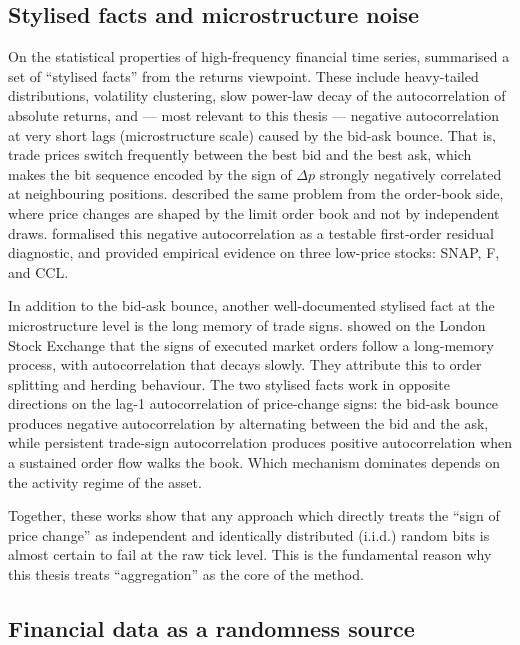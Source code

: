 \documentclass[11pt,titlepage,openany,oneside]{book}  %
\begin{document}
\subsection*{Stylised facts and microstructure noise}

On the statistical properties of high-frequency financial time series, \citet{cont2001stylized} summarised a set of ``stylised facts'' from the returns viewpoint. These include heavy-tailed distributions, volatility clustering, slow power-law decay of the autocorrelation of absolute returns, and --- most relevant to this thesis --- negative autocorrelation at very short lags (microstructure scale) caused by the bid-ask bounce. That is, trade prices switch frequently between the best bid and the best ask, which makes the bit sequence encoded by the sign of $\Delta p$ strongly negatively correlated at neighbouring positions. \citet{bouchaud2002orderbooks} described the same problem from the order-book side, where price changes are shaped by the limit order book and not by independent draws. \citet{shternshis2025predictability} formalised this negative autocorrelation as a testable first-order residual diagnostic, and provided empirical evidence on three low-price stocks: SNAP, F, and CCL.

In addition to the bid-ask bounce, another well-documented stylised fact at the microstructure level is the long memory of trade signs. \citet{lillo2004longmemory} showed on the London Stock Exchange that the signs of executed market orders follow a long-memory process, with autocorrelation that decays slowly. They attribute this to order splitting and herding behaviour. The two stylised facts work in opposite directions on the lag-1 autocorrelation of price-change signs: the bid-ask bounce produces negative autocorrelation by alternating between the bid and the ask, while persistent trade-sign autocorrelation produces positive autocorrelation when a sustained order flow walks the book. Which mechanism dominates depends on the activity regime of the asset.

Together, these works show that any approach which directly treats the ``sign of price change'' as independent and identically distributed (i.i.d.) random bits is almost certain to fail at the raw tick level. This is the fundamental reason why this thesis treats ``aggregation'' as the core of the method.

\subsection*{Financial data as a randomness source}
\end{document}
